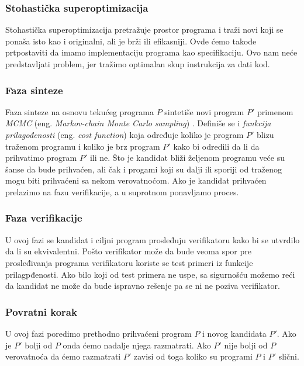 \subsubsection{Stohastička superoptimizacija}
\label{subsec:StohastickaSuperoptimizacija}

Stohastička superoptimizacija pretražuje prostor programa i traži novi koji se ponaša isto kao i originalni, ali je brži ili efikasniji. Ovde ćemo takođe prtpostaviti da imamo implementaciju programa kao specifikaciju. Ovo nam neće predstavljati problem, jer tražimo optimalan skup instrukcija za dati kod.


\subsubsection{Faza sinteze}


Faza sinteze na osnovu tekućeg programa $P$ sintetiše novi program $P'$ primenom \emph{MCMC} (eng. \emph{Markov-chain Monte Carlo sampling}) \cite{MCMC}. Definiše se i \emph{funkcija prilagođenosti} (eng. \emph{cost function}) koja određuje koliko je program $P'$ blizu traženom programu i koliko je brz program $P'$ kako bi odredili da li da prihvatimo program $P'$ ili ne. Što je kandidat bliži željenom programu veće su šanse da bude prihvaćen, ali čak i progami koji su dalji ili sporiji od traženog mogu biti prihvaćeni sa nekom verovatnoćom. Ako je kandidat prihvaćen prelazimo na fazu verifikacije, a u suprotnom ponavljamo proces.


\subsubsection{Faza verifikacije}


U ovoj fazi se kandidat i ciljni program prosleđuju verifikatoru kako bi se utvrdilo da li su ekvivalentni. Pošto verifikator može da bude veoma spor pre prosleđivanja programa verifikatoru koriste se test primeri iz funkcije prilagpđenosti. Ako bilo koji od test primera ne uspe, sa sigurnošću možemo reći da kandidat ne može da bude ispravno rešenje pa se ni ne poziva verifikator.


\subsubsection{Povratni korak}

U ovoj fazi poredimo prethodno prihvaćeni program $P$ i novog kandidata $P'$. Ako je $P'$ bolji od $P$ onda ćemo nadalje njega razmatrati. Ako $P'$ nije bolji od $P$ verovatnoća da ćemo razmatrati $P'$ zavisi od toga koliko su programi $P$ i $P'$ slični.


